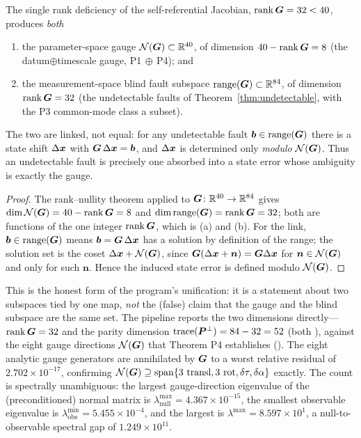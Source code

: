 \begin{proposition}
\label{prop:unification}
The single rank deficiency of the self-referential Jacobian, $\operatorname{rank}\bm{G}=32<40$, produces
\emph{both}
\begin{enumerate}
  \item[(a)] the parameter-space gauge $\mathcal{N}(\bm{G})\subset\mathbb{R}^{40}$, of dimension
  $40-\operatorname{rank}\bm{G}=8$ (the datum$\oplus$timescale gauge, P1$\,\oplus\,$P4); and
  \item[(b)] the measurement-space blind fault subspace $\operatorname{range}(\bm{G})\subset\mathbb{R}^{84}$, of
  dimension $\operatorname{rank}\bm{G}=32$ (the undetectable faults of Theorem~\ref{thm:undetectable}, with
  the P3 common-mode class a subset).
\end{enumerate}
The two are linked, not equal: for any undetectable fault $\bm{b}\in\operatorname{range}(\bm{G})$ there is a
state shift $\Delta\bm{x}$ with $\bm{G}\,\Delta\bm{x}=\bm{b}$, and $\Delta\bm{x}$ is determined
only \emph{modulo} $\mathcal{N}(\bm{G})$. Thus an undetectable fault is precisely one absorbed into
a state error whose ambiguity is exactly the gauge.
\end{proposition}

\begin{proof}
The rank--nullity theorem applied to $\bm{G}\colon\mathbb{R}^{40}\to\mathbb{R}^{84}$ gives
$\dim\mathcal{N}(\bm{G})=40-\operatorname{rank}\bm{G}=8$ and $\dim\operatorname{range}(\bm{G})=\operatorname{rank}\bm{G}=32$; both are functions of
the one integer $\operatorname{rank}\bm{G}$, which is (a) and (b). For the link, $\bm{b}\in\operatorname{range}(\bm{G})$ means
$\bm{b}=\bm{G}\,\Delta\bm{x}$ has a solution by definition of the range; the solution set is the
coset $\Delta\bm{x}+\mathcal{N}(\bm{G})$, since $\bm{G}(\Delta\bm{x}+\bm n)=\bm{G}\Delta\bm{x}$ for
$\bm n\in\mathcal{N}(\bm{G})$ and only for such $\bm n$. Hence the induced state error is defined
modulo $\mathcal{N}(\bm{G})$.
\end{proof}

This is the honest form of the program's unification: it is a statement about two subspaces
tied by one map, \emph{not} the (false) claim that the gauge and the blind subspace are the
same set. The pipeline reports the two dimensions directly---$\operatorname{rank}\bm{G}=32$ and the parity
dimension $\operatorname{trace}(\bm{P}^{\perp})=84-32=52$ (both \Validated{}), against the eight
gauge directions $\mathcal{N}(\bm{G})$ that Theorem P4 establishes (\Proven{}). The eight analytic
gauge generators are annihilated by $\bm{G}$ to a worst relative residual of $2.702\times
10^{-17}$, confirming $\mathcal{N}(\bm{G})\supseteq\operatorname{span}\{\text{3 transl},\text{3
rot},\delta\tau,\delta\alpha\}$ exactly. The count is spectrally unambiguous: the largest
gauge-direction eigenvalue of the (preconditioned) normal matrix is
$\lambda_{\text{null}}^{\max}=4.367\times10^{-15}$, the smallest observable eigenvalue is
$\lambda_{\text{obs}}^{\min}=5.455\times10^{-4}$, and the largest is
$\lambda^{\max}=8.597\times10^{1}$, a null-to-observable spectral gap of $1.249\times
10^{11}$.

